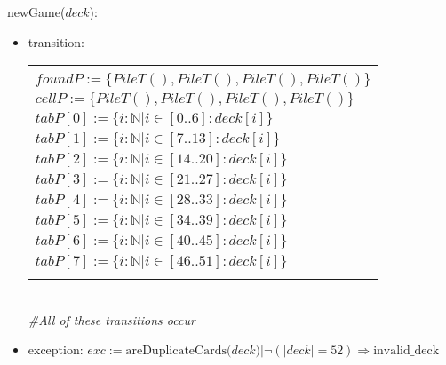 \documentclass[12pt]{article}
\begin{document}
\noindent newGame($deck$):
\begin{itemize}
\item transition: 
\begin{tabular}{|p{9cm}|}
\hhline{~|}
\multicolumn{1}{}{}\\
\hhline{|-|}
$foundP := \{PileT(),PileT(),PileT(),PileT()\}$ \\
\hhline{|-|}
$cellP := \{PileT(),PileT(),PileT(),PileT()\}$ \\
\hhline{|-|}
$tabP[0] := \{i : \mathbb{N} | i \in [0..6] : deck[i]\}$ \\
\hhline{|-|}
$tabP[1] := \{i : \mathbb{N} | i \in [7..13] : deck[i]\}$ \\
\hhline{|-|}
$tabP[2] := \{i : \mathbb{N} | i \in [14..20] : deck[i]\}$ \\
\hhline{|-|}
$tabP[3] := \{i : \mathbb{N} | i \in [21..27] : deck[i]\}$ \\
\hhline{|-|}
$tabP[4] := \{i : \mathbb{N} | i \in [28..33] : deck[i]\}$ \\
\hhline{|-|}
$tabP[5] := \{i : \mathbb{N} | i \in [34..39] : deck[i]\}$ \\
\hhline{|-|}
$tabP[6] := \{i : \mathbb{N} | i \in [40..45] : deck[i]\}$ \\
\hhline{|-|}
$tabP[7] := \{i : \mathbb{N} | i \in [46..51] : deck[i]\}$ \\
\hhline{|-|}
\end{tabular}\\
\textit{\#All of these transitions occur}
\item exception: $exc := \mbox{areDuplicateCards($deck$)} | \lnot(|deck| = 52) \Rightarrow \mbox{invalid\_deck} $\\
\end{itemize}
\end{document}
